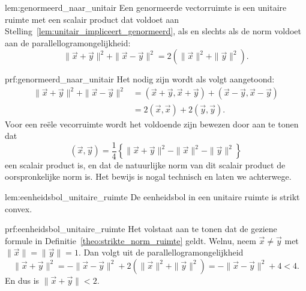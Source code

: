 \begin{lem}{lem:genormeerd_naar_unitair}
    Een genormeerde vectorruimte is een unitaire ruimte met een scalair product dat voldoet aan Stelling~\ref{lem:unitair_impliceert_genormeerd}, als en slechts als de norm voldoet aan de parallellogramongelijkheid:
    \begin{equation*}
        \| \vec{x} + \vec{y} \|^2 + \| \vec{x} - \vec{y} \|^2 = 2 \left(\| \vec{x} \|^2 + \| \vec{y} \|^2\right).
    \end{equation*}
    \vspace{-0.5cm}
\end{lem}

\begin{prf}{prf:genormeerd_naar_unitair}
    Het nodig zijn wordt als volgt aangetoond:
    \begin{align*}
        \|\vec{x} + \vec{y}\|^2 + \|\vec{x} - \vec{y}\|^2 
            &= (\vec{x} + \vec{y},\vec{x} + \vec{y}) + (\vec{x} - \vec{y},\vec{x} - \vec{y}) \\
            &= 2(\vec{x},\vec{x}) + 2(\vec{y},\vec{y}).
    \end{align*}
    Voor een reële vecorruimte wordt het voldoende zijn bewezen door aan te tonen dat
    \begin{equation*}
        (\vec{x},\vec{y}) = \frac{1}{4}\left\{
            \| \vec{x} + \vec{y} \|^2 - \| \vec{x} \|^2 - \| \vec{y} \|^2
        \right\}
    \end{equation*}
    een scalair product is, en dat de natuurlijke norm van dit scalair product de oorspronkelijke norm is. Het bewijs is nogal technisch en laten we achterwege.
\end{prf}

\begin{lem}{lem:eenheidsbol_unitaire_ruimte}
    De eenheidsbol in een unitaire ruimte is strikt convex.
\end{lem}

\newpage

\begin{prf}{prf:eenheidsbol_unitaire_ruimte}
    Het volstaat aan te tonen dat de geziene formule in Definitie~\ref{theo:strikte_norm_ruimte} geldt. Welnu, neem $\vec{x} \neq \vec{y}$ met $\|\vec{x}\| = \|\vec{y}\| = 1$. Dan volgt uit de parallellogramongelijkheid
    \begin{equation*}
        \| \vec{x} + \vec{y} \|^2 = - \| \vec{x} - \vec{y} \|^2 + 2(\| \vec{x} \|^2 + \| \vec{y}\|^2)= - \| \vec{x} - \vec{y} \|^2 + 4 < 4.
    \end{equation*}
    En dus is $\| \vec{x} + \vec{y} \| < 2$.
\end{prf}

